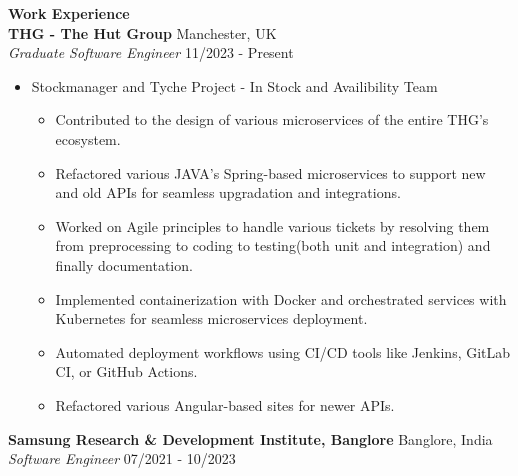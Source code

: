 \documentclass{article}
\begin{document}
\noindent \large \textbf{\textcolor{NavyBlue}{Work Experience}} \vspace{3pt} \\
\noindent \normalsize \textbf{THG - The Hut Group} \hfill Manchester, UK \\
\textit{Graduate Software Engineer} \hfill 11/2023 - Present
\begin{itemize}[noitemsep,nolistsep,leftmargin=*]
    \item {\normalsize {Stockmanager and Tyche Project - In Stock and Availibility Team }
        \begin{itemize}
            \item Contributed to the design of various microservices of the entire THG's ecosystem.
            \item Refactored various JAVA's Spring-based microservices to support new and old APIs for seamless upgradation and integrations.
            \item Worked on Agile principles to handle various tickets by resolving them from preprocessing to coding to testing(both unit and integration) and finally documentation.
            \item Implemented containerization with Docker and orchestrated services with Kubernetes for seamless microservices deployment.
            \item Automated deployment workflows using CI/CD tools like Jenkins, GitLab CI, or GitHub Actions.
            \item Refactored various Angular-based sites for newer APIs.
        \end{itemize}
    }
\end{itemize}
\noindent \normalsize \textbf{Samsung Research \& Development Institute, Banglore} \hfill Banglore, India \\
\textit{Software Engineer} \hfill 07/2021 - 10/2023
\end{document}
